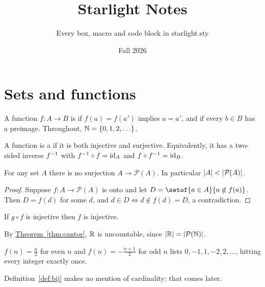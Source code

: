 \documentclass[10pt]{article}
\title{Starlight Notes}
\author{Every box, macro and code block in starlight.sty}
\date{Fall 2026}
\begin{document}
\maketitle

\section{Sets and functions}

A function $f\colon A \to B$ is  if $f(a) = f(a')$ implies $a = a'$,
and  if every $b \in B$ has a preimage. Throughout, $\N = \set{0, 1, 2, \dots}$.

\begin{definition}[Bijection]\label{def:bij}
  A function is a  if it is both injective and surjective. Equivalently,
  it has a two-sided inverse $f^{-1}$ with $f^{-1} \circ f = \operatorname{id}_A$ and $f \circ f^{-1} = \operatorname{id}_B$.
\end{definition}

\begin{theorem}[Cantor]\label{thm:cantor}
  For any set $A$ there is no surjection $A \to \mathcal{P}(A)$. In particular
  $\lvert A\rvert < \lvert\mathcal{P}(A)\rvert$.
\end{theorem}

\begin{proof}
  Suppose $f\colon A \to \mathcal{P}(A)$ is onto and let $D = \setof{a \in A}{a \notin f(a)}$.
  Then $D = f(d)$ for some $d$, and $d \in D \iff d \notin f(d) = D$, a contradiction.
\end{proof}

\begin{lemma}
  If $g \circ f$ is injective then $f$ is injective.
\end{lemma}
\begin{corollary}
  By \hyperref[thm:cantor]{Theorem~\ref*{thm:cantor}}, $\mathbb{R}$ is uncountable, since $\lvert\mathbb{R}\rvert = \lvert\mathcal{P}(\mathbb{N})\rvert$.
\end{corollary}

\begin{example}[A bijection $\N \to \Z$]
  $f(n) = \frac{n}{2}$ for even $n$ and $f(n) = -\frac{n+1}{2}$ for odd $n$ lists
  $0, -1, 1, -2, 2, \dots$, hitting every integer exactly once.
\end{example}

\begin{remark}
  Definition~\ref{def:bij} makes no mention of cardinality; that comes later.
\end{remark}
\end{document}
